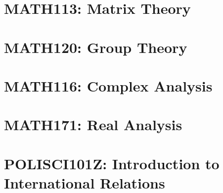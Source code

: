 \chapter{MATH113: Matrix Theory}

\chapter{MATH120: Group Theory}

\chapter{MATH116: Complex Analysis}

\chapter{MATH171: Real Analysis}


\chapter{POLISCI101Z: Introduction to International Relations}

